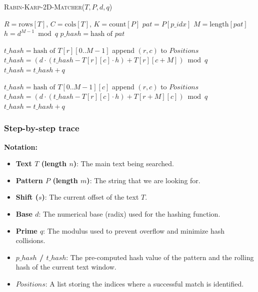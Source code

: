 \textsc{Rabin-Karp-2D-Matcher}($T, P, d, q$)
\begin{algorithmic}[1]
\State $R = \mathrm{rows}[T]$, $C = \mathrm{cols}[T]$, $K = \mathrm{count}[P]$
    \State $pat = P[p\_idx]$
    \State $M = \mathrm{length}[pat]$
    \State $h = d^{M-1} \bmod q$
    \State $p\_hash = \text{hash of } pat$
    
    \State {}
            \State $t\_hash = \text{hash of } T[r][0..M-1]$
                    \State append $(r, c)$ to $Positions$
                \EndIf
                    \State $t\_hash = (d \cdot (t\_hash - T[r][c] \cdot h) + T[r][c+M]) \bmod q$
                        \State $t\_hash = t\_hash + q$
                    \EndIf
                \EndIf
            \EndFor
        \EndFor
    \EndIf
    
    \State {}
            \State $t\_hash = \text{hash of } T[0..M-1][c]$
                    \State append $(r, c)$ to $Positions$
                \EndIf
                    \State $t\_hash = (d \cdot (t\_hash - T[r][c] \cdot h) + T[r+M][c]) \bmod q$
                        \State $t\_hash = t\_hash + q$
                    \EndIf
                \EndIf
            \EndFor
        \EndFor
    \EndIf
\EndFor
\end{algorithmic}

\subsubsection{Step-by-step trace}

\textbf{Notation:}
\begin{itemize}
    \item \textbf{Text $T$ (length $n$)}: The main text being searched.
    \item \textbf{Pattern $P$ (length $m$)}: The string that we are looking for.
    \item \textbf{Shift ($s$)}: The current offset of the text $T$.
    \item \textbf{Base $d$}: The numerical base (radix) used for the hashing function.
    \item \textbf{Prime $q$}: The modulus used to prevent overflow and minimize hash collisions.
    \item \textbf{$p\_hash$ / $t\_hash$}: The pre-computed hash value of the pattern and the rolling hash of the current text window.
    \item \textbf{$Positions$}: A list storing the indices where a successful match is identified.
\end{itemize}

